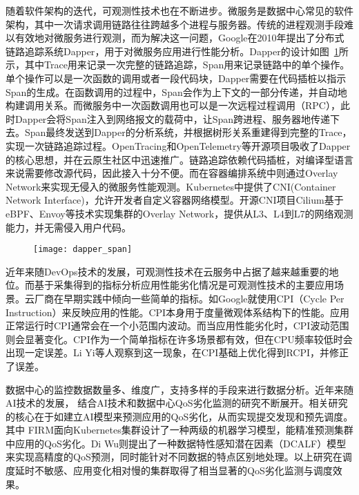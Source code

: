 随着软件架构的迭代，可观测性技术也在不断进步。微服务是数据中心常见的软件架构，其中一次请求调用链路往往跨越多个进程与服务器。传统的进程观测手段难以有效地对微服务进行观测，而为解决这一问题，Google在2010年提出了分布式链路追踪系统Dapper\citep{sigelman2010dapper}，用于对微服务应用进行性能分析。Dapper的设计如图~\ref{fig:dapper_trace}所示，其中Trace用来记录一次完整的链路追踪，Span用来记录链路中的单个操作。单个操作可以是一次函数的调用或者一段代码块，Dapper需要在代码插桩以指示Span的生成。在函数调用的过程中，Span会作为上下文的一部分传递，并自动地构建调用关系。而微服务中一次函数调用也可以是一次远程过程调用（RPC），此时Dapper会将Span注入到网络报文的载荷中，让Span跨进程、服务器地传递下去。Span最终发送到Dapper的分析系统，并根据树形关系重建得到完整的Trace，实现一次链路追踪过程。OpenTracing和OpenTelemetry等开源项目吸收了Dapper的核心思想，并在云原生社区中迅速推广。链路追踪依赖代码插桩，对编译型语言来说需要修改源代码，因此接入十分不便。而在容器编排系统中则通过Overlay Network来实现无侵入的微服务性能观测。Kubernetes中提供了CNI(Container Network Interface)\citep{k8s-network-plugins}，允许开发者自定义容器网络模型。开源CNI项目Cilium\citep{cilium}基于eBPF、Envoy等技术\citep{ebpf,envoyproxy}实现集群的Overlay Network，提供从L3、L4到L7的网络观测能力，并无需侵入用户代码。

\begin{figure}[H]
    \centering
    \texttt{[image: dapper\_span]}
    \label{fig:dapper_trace}
\end{figure}

近年来随DevOps技术的发展，可观测性技术在云服务中占据了越来越重要的地位。而基于采集得到的指标分析应用性能劣化情况是可观测性技术的主要应用场景。云厂商在早期实践中倾向一些简单的指标。如Google就使用CPI（Cycle Per Instruction）\citep{zhang2013cpi2}来反映应用的性能。CPI本身用于度量微观体系结构下的性能。应用正常运行时CPI通常会在一个小范围内波动。而当应用性能劣化时，CPI波动范围则会显著变化。CPI作为一个简单指标在许多场景都有效，但在CPU频率较低时会出现一定误差。Li Yi等人\citep{yi2020cpi}观察到这一现象，在CPI基础上优化得到RCPI，并修正了误差。

数据中心的监控数据数量多、维度广，支持多样的手段来进行数据分析。近年来随AI技术的发展， 结合AI技术和数据中心QoS劣化监测的研究不断展开。相关研究的核心在于如建立AI模型来预测应用的QoS劣化，从而实现提交发现和预先调度\citep{qiu2020firm, zhou2022aquatope, wang2022deepscaling, gan2021sage, ghafouri2020survey,zheng2020web,wu2019posterior}。其中
FIRM\citep{qiu2020firm}面向Kubernetes集群设计了一种两级的机器学习模型，能精准预测集群中应用的QoS劣化。Di Wu\citep{wu2020data}则提出了一种数据特性感知潜在因素（DCALF）模型来实现高精度的QoS预测，同时能针对不同数据的特点区别地处理。以上研究在调度延时不敏感、应用变化相对慢的集群取得了相当显著的QoS劣化监测与调度效果。


